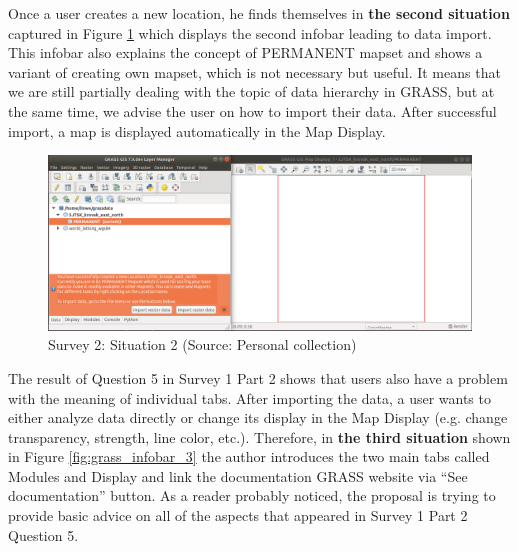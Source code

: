 \documentclass[a4paper,10pt,twoside]{article}
\begin{document}
\newpage
\noindent Once a user creates a new location, he finds themselves in
\textbf{the second situation} captured in Figure
\ref{fig:grass_infobar_2} which displays the second infobar leading
to data import. This infobar also explains the concept of PERMANENT
mapset and shows a variant of creating own mapset, which is not
necessary but useful. It means that we are still partially dealing
with the topic of data hierarchy in GRASS, but at the same time, we
advise the user on how to import their data. After successful import,
a map is displayed automatically in the Map Display.

\vspace{0.3cm}
\begin{figure}[hbt!] 
\begin{center}
\includegraphics[width=17cm]{../pictures/grass_infobar_2.png} 
\caption[Survey 2: Situation 2]{Survey 2: Situation 2 (Source: Personal collection)}
\label{fig:grass_infobar_2}
\end{center}
\end{figure}

\noindent The result of Question 5 in Survey 1 Part 2
shows that users also have a problem with the meaning of
individual tabs. After importing the data, a user wants to either
analyze data directly or change its display in the Map Display
(e.g. change transparency, strength, line color, etc.). Therefore, 
in \textbf{the third situation} shown in Figure \ref{fig:grass_infobar_3} 
the author introduces the two main tabs called Modules and Display and
link the documentation GRASS website \cite{manual} via ``See documentation''  
button. As a reader probably noticed, the proposal is trying to provide
basic advice on all of the aspects that appeared in Survey 1 Part 2
Question 5.
\end{document}
